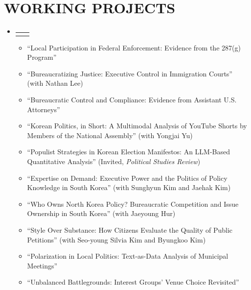\documentclass[a4paper,11pt]{article}
\makeatletter
\newcommand{\resumeItem}[1]{
  \item\small{
    {#1 \vspace{-2pt}}
  }
}
\newcommand{\resumeProjectHeading}[2]{
    \item
    \begin{tabular*}{1.001\textwidth}{l@{\extracolsep{\fill}}r}
      \small#1 & \textbf{\small #2}\\
    \end{tabular*}\vspace{-7pt}
}
\newcommand{\resumeSubItem}[1]{%
  \item[]\hspace{\labelwidth}\hspace{-\labelsep}%
  {-} \hspace{1pt}%
  \small{#1}%
}
\newcommand{\resumeSubHeadingListStart}{\begin{itemize}[leftmargin=0.0in, label={}]}
\newcommand{\resumeSubHeadingListEnd}{\end{itemize}}
\newcommand{\resumeItemListStart}{\begin{itemize}}
\newcommand{\resumeItemListEnd}{\end{itemize}\vspace{-5pt}}
\makeatother
\begin{document}
\section{WORKING PROJECTS}
    \vspace{-4pt}
    \resumeSubHeadingListStart
     \resumeProjectHeading
          {}{}
          \vspace{-25pt}
          \resumeItemListStart
            \resumeItem{``Local Participation in Federal Enforcement: Evidence from the 287(g) Program''}\\[0.7em]
            \resumeItem{``Bureaucratizing Justice: Executive Control in Immigration Courts'' (with Nathan Lee)}\\[0.7em]
            \resumeItem{``Bureaucratic Control and Compliance: Evidence from Assistant U.S. Attorneys''}\\[0.7em]
            \resumeItem{``Korean Politics, in Short: A Multimodal Analysis of YouTube Shorts by Members of the National Assembly'' (with Yongjai Yu)}\\[0.7em]
            \resumeItem{``Populist Strategies in Korean Election Manifestos: An LLM-Based Quantitative Analysis'' (Invited, \emph{Political Studies Review})}\\[0.7em]
            \resumeItem{``Expertise on Demand: Executive Power and the Politics of Policy Knowledge in South Korea'' (with Sunghyun Kim and Jaehak Kim)}\\[0.7em]
            \resumeItem{``Who Owns North Korea Policy? Bureaucratic Competition and Issue Ownership in South Korea'' (with Jaeyoung Hur)}\\[0.7em]
            \resumeItem{``Style Over Substance: How Citizens Evaluate the Quality of Public Petitions'' (with Seo-young Silvia Kim and Byungkoo Kim)}\\[0.7em]

            \resumeItem{``Polarization in Local Politics: Text-as-Data Analysis of Municipal Meetings''}\\[0.7em]
            \resumeItem{``Unbalanced Battlegrounds: Interest Groups' Venue Choice Revisited''}
          \resumeItemListEnd
    \resumeSubHeadingListEnd
\vspace{0pt}
\end{document}
